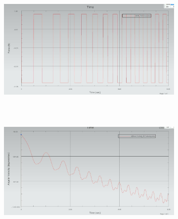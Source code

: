 \documentclass[12pt]{article}
\begin{document}
{\begin{figure}[H]
		\begin{subfigure}{0.49\textwidth}
			\centering\includegraphics[height=6cm,width=1\textwidth,keepaspectratio]{var5_1.jpeg}
			\caption{}
			\label{fig:var5_1.jpeg}
		\end{subfigure}
		\begin{subfigure}{0.49\textwidth}
			\centering\includegraphics[height=6cm,width=1\textwidth,keepaspectratio]{var5_2.jpeg}
			\caption{}
			\label{fig:var5_2.jpeg}
		\end{subfigure}
	\end{figure}
}
\end{document}
